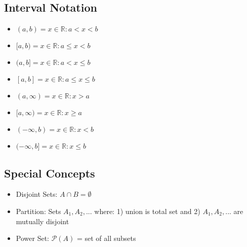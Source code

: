 \documentclass[8pt,landscape]{article}
\begin{document}
\begin{multicols*}{4}
		\subsection*{Interval Notation}
		\begin{itemize}[leftmargin=*]
			\item $(a,b) = {x \in \mathbb{R} : a < x < b}$
			\item $[a,b) = {x \in \mathbb{R} : a \leq x < b}$
			\item $(a,b] = {x \in \mathbb{R} : a < x \leq b}$
			\item $[a,b] = {x \in \mathbb{R} : a \leq x \leq b}$
			\item $(a,\infty) = {x \in \mathbb{R} : x > a}$
			\item $[a,\infty) = {x \in \mathbb{R} : x \geq a}$
			\item $(-\infty,b) = {x \in \mathbb{R} : x < b}$
			\item $(-\infty,b] = {x \in \mathbb{R} : x \leq b}$
		\end{itemize}
		\subsection*{Special Concepts}
		\begin{itemize}[leftmargin=*]
			\item Disjoint Sets: $A \cap B = \emptyset$
			\item Partition: Sets $A_1, A_2, ...$ where: 1) union is total set and 2) $A_1,A_2,...$ are mutually disjoint
			\item Power Set: $\mathscr{P}(A)$ = set of all subsets
		\end{itemize}
		

\end{multicols*}
\end{document}
